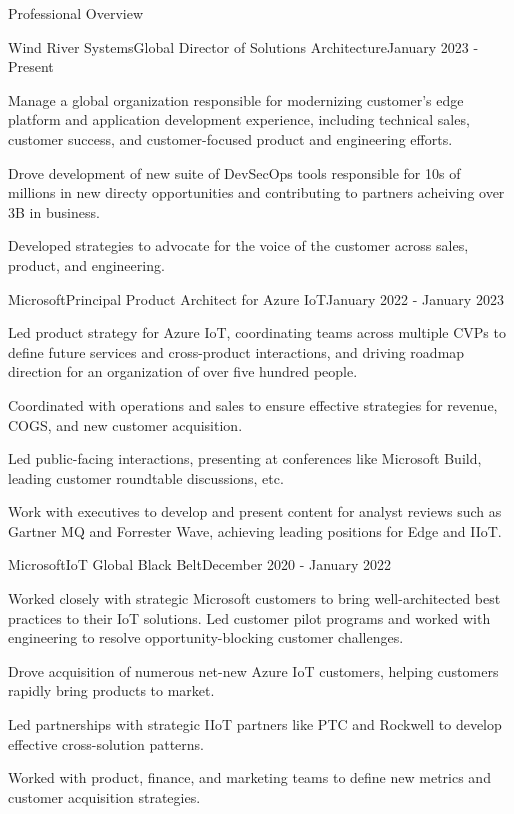\documentclass{resume} %
\begin{document}
\begin{rSection}{Professional Overview}
  
  \begin{rNewRole}{Wind River Systems}{Global Director of Solutions Architecture}{January 2023 - Present}
    \item Manage a global organization responsible for modernizing customer's edge platform and application development experience, including technical sales, customer success, and customer-focused product and engineering efforts.
    \item Drove development of new suite of DevSecOps tools responsible for 10s of millions in new directy opportunities and contributing to partners acheiving over 3B in business.
    \item Developed strategies to advocate for the voice of the customer across sales, product, and engineering.
  \end{rNewRole}

  \begin{rNewRole}{Microsoft}{Principal Product Architect for Azure IoT}{January 2022 - January 2023}
      
    \item Led product strategy for Azure IoT, coordinating teams across multiple CVPs to define future services and cross-product interactions, and driving roadmap direction for an organization of over five hundred people.
    \item Coordinated with operations and sales to ensure effective strategies for revenue, COGS, and new customer acquisition.
    \item Led public-facing interactions, presenting at conferences like Microsoft Build, leading customer roundtable discussions, etc.
    \item Work with executives to develop and present content for analyst reviews such as Gartner MQ and Forrester Wave, achieving leading positions for Edge and IIoT.
    
  \end{rNewRole}

  \begin{rNewRole}{Microsoft}{IoT Global Black Belt}{December 2020 - January 2022}
      
    \item Worked closely with strategic Microsoft customers to bring well-architected best practices to their IoT solutions. Led customer pilot programs and worked with engineering to resolve opportunity-blocking customer challenges.  
    \item Drove acquisition of numerous net-new Azure IoT customers, helping customers rapidly bring products to market.
    \item Led partnerships with strategic IIoT partners like PTC and Rockwell to develop effective cross-solution patterns.
    \item Worked with product, finance, and marketing teams to define new metrics and customer acquisition strategies.
    

\end{rNewRole}
\end{rSection}
\end{document}
